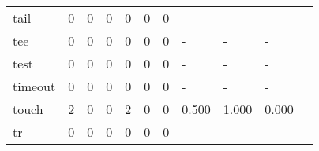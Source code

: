 \begin{longtable}{lp{1.2cm}p{1.2cm}p{1.2cm}p{1.2cm}p{1.2cm}p{1.2cm}p{1.2cm}p{1.2cm}p{1.2cm}p{1.2cm}}
tail      &                                     0 &                                                  0 &                                                  0 &                                                  0 &                                                  0 &                                                  0 &                                             - &                                                  - &                                                  - \\
tee       &                                     0 &                                                  0 &                                                  0 &                                                  0 &                                                  0 &                                                  0 &                                             - &                                                  - &                                                  - \\
test      &                                     0 &                                                  0 &                                                  0 &                                                  0 &                                                  0 &                                                  0 &                                             - &                                                  - &                                                  - \\
timeout   &                                     0 &                                                  0 &                                                  0 &                                                  0 &                                                  0 &                                                  0 &                                             - &                                                  - &                                                  - \\
touch     &                                     2 &                                                  0 &                                                  0 &                                                  2 &                                                  0 &                                                  0 &                                         0.500 &                                              1.000 &                                              0.000 \\
tr        &                                     0 &                                                  0 &                                                  0 &                                                  0 &                                                  0 &                                                  0 &                                             - &                                                  - &                                                  - \\

\end{longtable}

